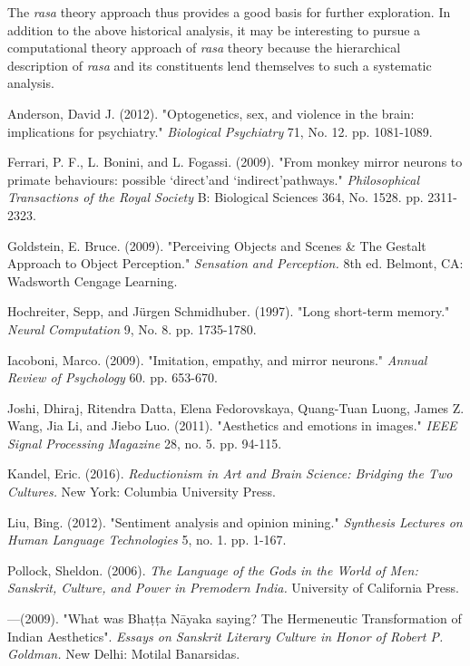 The \textsl{rasa} theory approach thus provides a good basis for further exploration. In addition to the above historical analysis, it may be interesting to pursue a computational theory approach of \textsl{rasa} theory because the hierarchical description of \textsl{rasa} and its constituents lend themselves to such a systematic analysis.

\begin{thebibliography}{99}
\itemsep=2pt
Anderson, David J. (2012). "Optogenetics, sex, and violence in the brain: implications for psychiatry." \textsl{Biological Psychiatry} 71, No. 12. pp. 1081-1089.

Ferrari, P. F., L. Bonini, and L. Fogassi. (2009). "From monkey mirror neurons to primate behaviours: possible ‘direct’and ‘indirect’pathways." \textsl{Philosophical Transactions of the Royal Society} B: Biological Sciences 364, No. 1528. pp. 2311-2323.

Goldstein, E. Bruce. (2009). "Perceiving Objects and Scenes \& The Gestalt Approach to Object Perception." \textsl{Sensation and Perception.} 8th ed. Belmont, CA: Wadsworth Cengage Learning.

Hochreiter, Sepp, and Jürgen Schmidhuber. (1997). "Long short-term memory." \textsl{Neural} \textsl{Computation} 9, No. 8. pp. 1735-1780.

Iacoboni, Marco. (2009). "Imitation, empathy, and mirror neurons." \textsl{Annual Review of Psychology} 60. pp. 653-670.

Joshi, Dhiraj, Ritendra Datta, Elena Fedorovskaya, Quang-Tuan Luong, James Z. Wang, Jia Li, and Jiebo Luo. (2011). "Aesthetics and emotions in images." \textsl{IEEE Signal Processing Magazine} 28, no. 5. pp. 94-115.

Kandel, Eric. (2016). \textsl{Reductionism in Art and Brain Science: Bridging the Two Cultures.} New York: Columbia University Press.

Liu, Bing. (2012). "Sentiment analysis and opinion mining." \textsl{Synthesis Lectures on Human Language Technologies} 5, no. 1. pp. 1-167.

Pollock, Sheldon. (2006). \textsl{The Language of the Gods in the World of Men: Sanskrit, Culture, and Power in Premodern India.} University of California Press.

---\kern3pt(2009). "What was Bhaṭṭa Nāyaka saying? The Hermeneutic Transformation of Indian Aesthetics". \textsl{Essays on Sanskrit Literary Culture in Honor of Robert P. Goldman.} New Delhi: Motilal Banarsidas.


\end{thebibliography}
